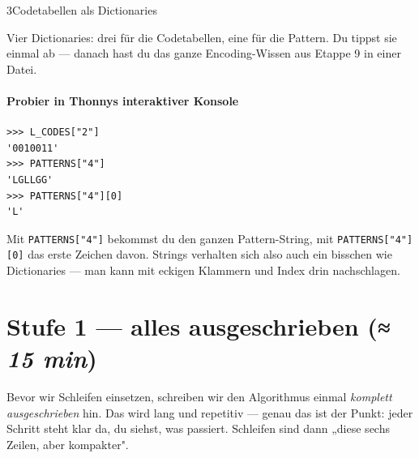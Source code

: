 \begin{pythoneinheit}{3}{Codetabellen als Dictionaries}

Vier Dictionaries: drei für die Codetabellen, eine für die Pattern.
Du tippst sie einmal ab — danach hast du das ganze Encoding-Wissen
aus Etappe 9 in einer Datei.

\paragraph{Probier in Thonnys interaktiver Konsole}

\begin{verbatim}
>>> L_CODES["2"]
'0010011'
>>> PATTERNS["4"]
'LGLLGG'
>>> PATTERNS["4"][0]
'L'
\end{verbatim}

Mit \texttt{PATTERNS["4"]} bekommst du den ganzen Pattern-String,
mit \texttt{PATTERNS["4"][0]} das erste Zeichen davon. Strings
verhalten sich also auch ein bisschen wie Dictionaries — man kann
mit eckigen Klammern und Index drin nachschlagen.
\end{pythoneinheit}

\section{Stufe 1 — alles ausgeschrieben \normalfont(\textit{≈ 15 min})}

Bevor wir Schleifen einsetzen, schreiben wir den Algorithmus einmal
\emph{komplett ausgeschrieben} hin. Das wird lang und repetitiv —
genau das ist der Punkt: jeder Schritt steht klar da, du siehst, was
passiert. Schleifen sind dann „diese sechs Zeilen, aber kompakter".

